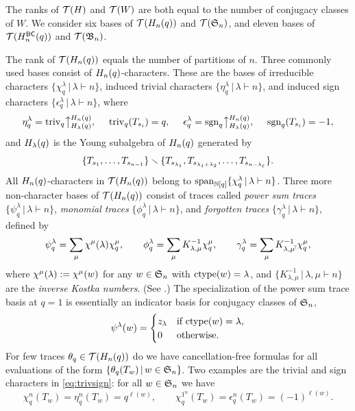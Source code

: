 \documentclass[11pt]{article}
\theoremstyle{definition}
\numberwithin{equation}{section}
\begin{document}
The ranks of $\mathcal{T}(H)$ and $\mathcal{T}(W)$ are both equal to
the number of conjugacy classes of $W$.
We consider six bases of $\mathcal{T}(H_n(q))$ and $\mathcal{T}(\mathfrak{S}_n)$,
and eleven bases of $\mathcal{T}(H_n^{\mathsf{BC}}(q))$ and $\mathcal{T}(\mathfrak{B}_n)$.

\label{ss:snhnq}

The rank of $\mathcal{T}(H_n(q))$ equals the number of partitions of $n$.
Three commonly used bases
consist of $H_n(q)$-characters.
These are the bases of
irreducible characters $\{ \chi_q^\lambda \,|\, \lambda \vdash n \}$,
induced trivial characters $\{ \eta_q^\lambda \,|\, \lambda \vdash n \}$,
and induced sign characters $\{ \epsilon_q^\lambda \,|\, \lambda \vdash n \}$,
where
\begin{equation}\label{eq:trivsign}
\eta_q^\lambda = \triv_q \upparrow_{\hlq}^{\hnq},
\ \quad \triv_q(T_{s_i}) = q,
  \ \quad \epsilon_q^\lambda = \sgn_q \upparrow_{\hlq}^{\hnq},
  \ \quad \sgn_q(T_{s_i}) = -1,
\end{equation}
and $H_\lambda(q)$ is the Young subalgebra of $H_n(q)$ generated by
\begin{equation*}
  \{ T_{s_1}, \dotsc, T_{s_{n-1}} \} \smallsetminus
  \{ T_{s_{\lambda_1}}, T_{s_{\lambda_1 + \lambda_2}}, \dotsc, T_{s_{n-\lambda_\ell}} \}.
\end{equation*}
All $H_n(q)$-characters in $\mathcal{T}(H_n(q))$ belong to $\mathrm{span}_{\mathbb N[q]}\{ \chi_q^\lambda \,|\, \lambda \vdash n\}$. 
Three more non-character bases of $\mathcal{T}(H_n(q))$ consist of traces
called
{\em power sum traces} $\{ \psi_q^\lambda \,|\, \lambda \vdash n \}$,
{\em monomial traces} $\{ \phi_q^\lambda \,|\, \lambda \vdash n \}$, and
{\em forgotten traces} $\{ \gamma_q^\lambda \,|\, \lambda \vdash n \}$,
defined by
\begin{equation*}
  \psi_q^\lambda = \sum_\mu \chi^\mu(\lambda) \chi_q^\mu,
  \qquad
  \phi_q^\lambda = \sum_\mu K^{-1}_{\lambda,\mu} \chi_q^\mu,
  \qquad
  \gamma_q^\lambda = \sum_\mu K^{-1}_{\lambda,\mu^{\negthickspace \top \negthickspace}} \chi_q^\mu,
\end{equation*}
where $\chi^\mu(\lambda) := \chi^\mu(w)$
for any $w \in \mathfrak{S}_n$ with $\mathrm{ctype}(w) = \lambda$,
and $\{K^{-1}_{\lambda,\mu} \,|\, \lambda,\mu \vdash n \}$ are the {\em inverse
Kostka numbers}.  (See \cite[\S 7]{StanEC2}.)
The specialization of the power sum trace basis at $q=1$
is 
essentially an indicator basis for conjugacy classes of $\mathfrak{S}_n$,
\begin{equation}\label{eq:psidef}
  \psi^{\lambda}(w) = \begin{cases}
    z_\lambda &\text{if $\ctype(w) = \lambda$},\\
    0       &\text{otherwise}.
  \end{cases}
\end{equation}
For few traces $\theta_q \in \mathcal{T}(H_n(q))$
do we have cancellation-free formulas for all
evaluations of the form $\{\theta_q(T_w) \,|\, w \in \mathfrak{S}_n \}$.
Two examples are the trivial and sign characters
in \eqref{eq:trivsign}:
for all $w \in \mathfrak{S}_n$ we have
\begin{equation*}
  \chi^n_q(T_w) = \eta^n_q(T_w) = q^{\ell(w)}, \qquad
  \chi^{1^n}_q(T_w) = \epsilon^n_q(T_w) = (-1)^{\ell(w)}.
  \end{equation*}
\end{document}
